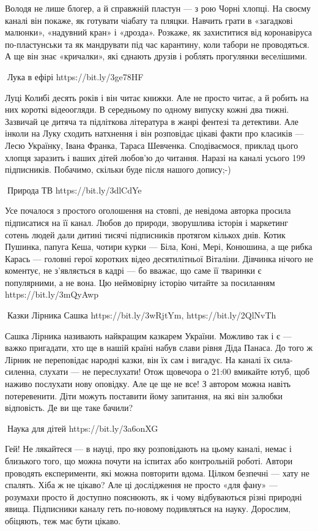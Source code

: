 Володя не лише блогер, а й справжній пластун — з рою Чорні хлопці. На своєму каналі він покаже, як готувати чіабату та пляцки. Навчить грати в «загадкові малюнки», «надувний кран» і «дрозда». Розкаже, як захиститися від коронавіруса по-пластунськи та як мандрувати під час карантину, коли табори не проводяться. А ще він знає «кричалки», які єднають друзів і роблять прогулянки веселішими.

🦉Лука в ефірі https://bit.ly/3ge78HF 

Луці Колибі десять років і він читає книжки. Але не просто читає, а й робить на них короткі відеоогляди. В середньому по одному випуску кожні два тижні. Зазвичай це дитяча та підліткова література в жанрі фентезі та детективи. Але інколи на Луку сходить натхнення і він розповідає цікаві факти про класиків — Лесю Українку, Івана Франка, Тараса Шевченка. Сподіваємося, приклад цього хлопця заразить і ваших дітей любов’ю до читання. Наразі на каналі усього 199 підписників. Побачимо, скільки буде після нашого допису;-)

🦉Природа ТВ https://bit.ly/3dlCdYe

Усе почалося з простого оголошення на стовпі, де невідома авторка просила підписатися на її канал. Любов до природи, зворушлива історія і маркетинг сотень людей дали дитині тисячі підписників протягом кількох днів. Котик Пушинка, папуга Кеша, чотири курки — Біла, Коні, Мері, Конюшина, а ще рибка Карась — головні герої коротких відео десятилітньої Віталіни. Дівчинка нічого не коментує, не з’являється в кадрі — бо вважає, що саме її тваринки є популярними, а не вона. Цю неймовірну історію читайте за посиланням https://bit.ly/3mQyAwp

🦉Казки Лірника Сашка https://bit.ly/3wRjtYm, https://bit.ly/2QlNvTh

Сашка Лірника називають найкращим казкарем України. Можливо так і є — важко
пригадати, хто ще в нашій країні набув слави рівня Діда Панаса. До того ж
Лірник не переповідає народні казки, він їх сам і вигадує. На каналі їх
сила-силенна, слухати  — не переслухати! Отож щовечора о 21:00 вмикайте ютуб,
щоб наживо послухати нову оповідку. Але це ще не все! З автором можна навіть
потеревенити. Діти можуть поставити йому запитання, на які він залюбки
відповість. Де ви ще таке бачили?

🦉Наука для дітей https://bit.ly/3a6onXG

Гей! Не лякайтеся — в науці, про яку розповідають на цьому каналі, немає і
близького того, що можна почути на іспитах або контрольній роботі. Автори
проводять експерименти, які можна повторити вдома. Цілком безпечні — хату не
спалять. Хіба ж не цікаво? Але ці дослідження не просто «для фану» — розумахи
просто й доступно пояснюють, як і чому відбуваються різні природні явища.
Підписники каналу геть по-новому подивляться на науку. Дорослим, обіцяють, теж
має бути цікаво.

